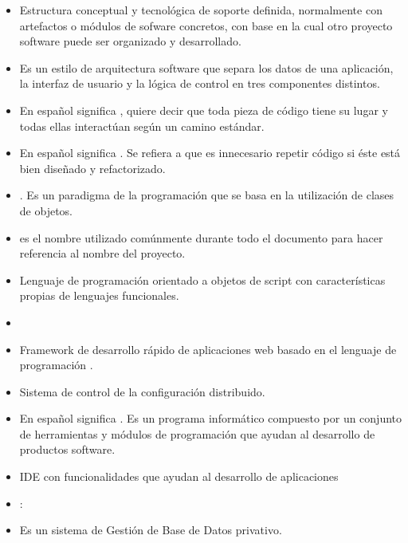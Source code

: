 \begin{itemize}
\item {} Estructura conceptual y tecnológica de soporte
  definida, normalmente con artefactos o módulos de sofware concretos, con base
  en la cual otro proyecto software puede ser organizado y desarrollado.
\item {} Es un estilo de
  arquitectura software que separa los datos de una aplicación, la interfaz de
  usuario y la lógica de control en tres componentes distintos.
\item {} En español significa
  , quiere decir que toda pieza de
  código tiene su lugar y todas ellas interactúan según un camino estándar.
\item {} En español significa . Se refiera a que es innecesario repetir código si éste está
  bien diseñado y refactorizado.
\item {} . Es un paradigma de la
  programación que se basa en la utilización de clases de objetos.
\item {} es el nombre utilizado comúnmente
  durante todo el documento para hacer referencia al nombre del proyecto.
\item {} Lenguaje de programación orientado a objetos de script
  con características propias de lenguajes funcionales.
\item {}
\item {} Framework de desarrollo rápido de
  aplicaciones web basado en el lenguaje de programación .
\item {} Sistema de control de la configuración distribuido.
\item {} En español significa
  . Es un programa informático
  compuesto por un conjunto de herramientas y módulos de programación que ayudan
  al desarrollo de productos software.
\item {} IDE con funcionalidades que ayudan al desarrollo de
  aplicaciones 
\item {}:
\item {} Es un sistema de Gestión de Base de Datos privativo.

\end{itemize}
